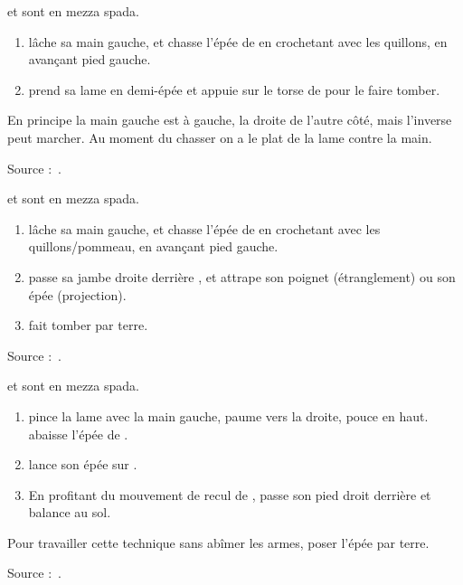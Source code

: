 \begin{technique}

\A et \D sont en mezza spada.

\begin{enumerate}
	\item \A lâche sa main gauche, et chasse l'épée de \D en crochetant avec les quillons, en avançant pied gauche.
	\item \A prend sa lame en demi-épée et appuie sur le torse de \D pour le faire tomber.
\end{enumerate}

En principe la main gauche est à gauche, la droite de l'autre côté, mais l'inverse peut marcher.
Au moment du chasser on a le plat de la lame contre la main.

Source :~\cite{petit:dijon:close_longword:2015}.

\end{technique}


\begin{technique}

\A et \D sont en mezza spada.

\begin{enumerate}
	\item \A lâche sa main gauche, et chasse l'épée de \D en crochetant avec les quillons/pommeau, en avançant pied gauche.
	\item \A passe sa jambe droite derrière \D, et attrape son poignet (étranglement) ou son épée (projection).
	\item \A fait tomber \D par terre.
\end{enumerate}

Source :~\cite{petit:dijon:close_longword:2015}.

\end{technique}


\begin{technique}

\A et \D sont en mezza spada.

\begin{enumerate}
	\item \A pince la lame avec la main gauche, paume vers la droite, pouce en haut.
		\A abaisse l'épée de \D.
	\item \A lance son épée sur \D.
	\item En profitant du mouvement de recul de \D, \A passe son pied droit derrière et balance \D au sol.
\end{enumerate}

Pour travailler cette technique sans abîmer les armes, poser l'épée par terre.

Source :~\cite{petit:dijon:close_longword:2015}.

\end{technique}


